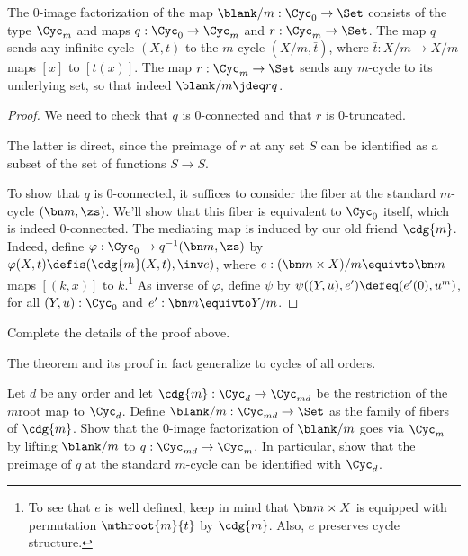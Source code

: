 \begin{theorem}\label{thm:image-Z-to-Cm}
  The $0$-image factorization of the map $\blank/m : \Cyc_0 \to \Set$
  consists of the type $\Cyc_m$ and maps $q : \Cyc_0 \to \Cyc_m$
  and $r:\Cyc_m\to\Set$. The map $q$
  sends any infinite cycle $(X,t)$ to the $m$-cycle $(X/m,\bar t)$,
  where $\bar t : X/m \to X/m$ maps $[x]$ to $[t(x)]$. The map
  $r:\Cyc_m\to\Set$ sends any $m$-cycle to its underlying set,
  so that indeed $\blank/m \jdeq rq$.
\end{theorem}

\begin{proof}
  We need to check that $q$ is $0$-connected
  and that $r$ is $0$-truncated.

  The latter is direct, since the preimage of $r$ at any set $S$
  can be identified as a subset of the set of functions $S\to S$.

  To show that $q$ is $0$-connected,
  it suffices to consider the fiber at the standard $m$-cycle $(\bn m,\zs)$.
  We'll show that this fiber is equivalent to $\Cyc_0$ itself,
  which is indeed $0$-connected.
  The mediating map is induced by our old friend $\cdg{m}$.
  Indeed, define $\varphi : \Cyc_0 \to q^{-1}(\bn m,\zs)$
  by $\varphi(X,t)\defis(\cdg{m}(X,t),\inv e)$, where
  $e: (\bn m\times X)/m \equivto \bn m$ maps $[(k,x)]$ to $k$.\footnote{%
  To see that $e$ is well defined, keep in mind that $\bn m\times X$
  is equipped with permutation $\mthroot{m}{t}$ by $\cdg{m}$. Also,
  $e$ preserves cycle structure.}
  As inverse of $\varphi$, define $\psi$ by
  $\psi((Y,u),e')\defeq(e'(0), u^m)$, for all
  $(Y,u):\Cyc_0$ and $e' : \bn m \equivto Y/m$.
\end{proof}

\begin{xca}
  Complete the details of the proof above.
\end{xca}

The theorem and its proof in fact generalize to cycles of all orders.

\begin{xca}\label{xca:image-Cmd-to-Cm}
  Let $d$ be any order and let $\cdg{m} : \Cyc_d\to\Cyc_{md}$
  be the restriction of the $m$\th root map to $\Cyc_d$.
  Define $\blank/m : \Cyc_{md} \to \Set$ as the family of fibers
  of $\cdg{m}$.
  Show that the $0$-image factorization of $\blank/m$ goes via $\Cyc_m$ by
  lifting $\blank/m$ to $q : \Cyc_{md} \to \Cyc_m$.
  In particular, show that the preimage of $q$ at the standard $m$-cycle
  can be identified with $\Cyc_d$.
\end{xca}

